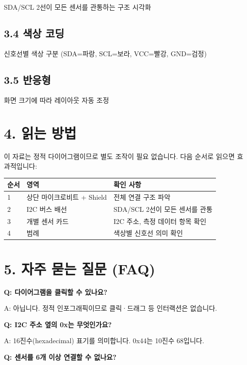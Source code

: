 \documentclass[11pt,a4paper]{article}
\begin{document}
SDA/SCL 2선이 모든 센서를 관통하는 구조 시각화


\subsection*{3.4 색상 코딩}

신호선별 색상 구분 (SDA=파랑, SCL=보라, VCC=빨강, GND=검정)


\subsection*{3.5 반응형}

화면 크기에 따라 레이아웃 자동 조정



\section*{4. 읽는 방법}

이 자료는 정적 다이어그램이므로 별도 조작이 필요 없습니다. 다음 순서로 읽으면 효과적입니다:


\begin{center}
\renewcommand{\arraystretch}{1.4}
\begin{tabular}{|p{1.5cm}|p{6.4cm}|p{7.1cm}|}
\hline
\rowcolor{tableheader}
\textbf{순서} & \textbf{영역} & \textbf{확인 사항} \\
\hline
1 & 상단 마이크로비트 + Shield & 전체 연결 구조 파악 \\
\hline
2 & I2C 버스 배선 & SDA/SCL 2선이 모든 센서를 관통 \\
\hline
3 & 개별 센서 카드 & I2C 주소, 측정 데이터 항목 확인 \\
\hline
4 & 범례 & 색상별 신호선 의미 확인 \\
\hline
\end{tabular}
\end{center}


\section*{5. 자주 묻는 질문 (FAQ)}

\textbf{Q: 다이어그램을 클릭할 수 있나요?}


A: 아닙니다. 정적 인포그래픽이므로 클릭·드래그 등 인터랙션은 없습니다.


\textbf{Q: I2C 주소 옆의 0x는 무엇인가요?}


A: 16진수(hexadecimal) 표기를 의미합니다. 0x44는 10진수 68입니다.


\textbf{Q: 센서를 6개 이상 연결할 수 없나요?}
\end{document}
